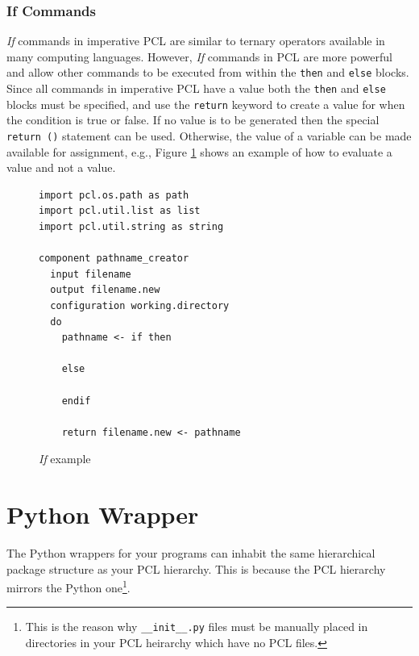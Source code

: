 \subsubsection{If Commands}
\emph{If} commands in imperative PCL are similar to ternary operators available in many computing languages. However, \emph{If} commands in PCL are more powerful and allow other commands to be executed from within the \texttt{then} and \texttt{else} blocks. Since all commands in imperative PCL have a value both the \texttt{then} and \texttt{else} blocks must be specified, and use the \texttt{return} keyword to create a value for when the condition is true or false. If no value is to be generated then the special \texttt{return ()} statement can be used. Otherwise, the value of a variable can be made available for assignment, e.g., Figure \ref{fig:imperative-pcl-if-example} shows an example of how to evaluate a value and not a value.
\begin{figure}[h!]
  \begin{verbatim}
import pcl.os.path as path
import pcl.util.list as list
import pcl.util.string as string

component pathname_creator
  input filename
  output filename.new
  configuration working.directory
  do
    pathname <- if then

    else
  
    endif

    return filename.new <- pathname
  \end{verbatim}
  \caption{\emph{If} example}
  \label{fig:imperative-pcl-if-example}
\end{figure}

\section{Python Wrapper}
The Python wrappers for your programs can inhabit the same hierarchical package structure as your PCL hierarchy. This is because the PCL hierarchy mirrors the Python one\footnote{This is the reason why \texttt{\_\_init\_\_.py} files must be manually placed in directories in your PCL heirarchy which have no PCL files.}.

